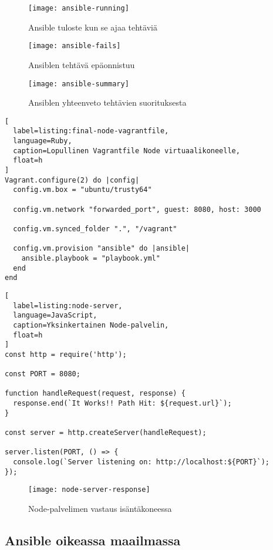 \begin{figure}[h]
  \texttt{[image: ansible-running]}
  \caption{Ansible tuloste kun se ajaa tehtäviä}
  \label{fig:ansible-running}
\end{figure}

\begin{figure}[h]
  \texttt{[image: ansible-fails]}
  \caption{Ansiblen tehtävä epäonnistuu}
  \label{fig:ansible-fails}
\end{figure}

\begin{figure}[h]
  \texttt{[image: ansible-summary]}
  \caption{Ansiblen yhteenveto tehtävien suorituksesta}
  \label{fig:ansible-summary}
\end{figure}

\begin{lstlisting}[
  label=listing:final-node-vagrantfile,
  language=Ruby,
  caption=Lopullinen Vagrantfile Node virtuaalikoneelle,
  float=h
]
Vagrant.configure(2) do |config|
  config.vm.box = "ubuntu/trusty64"

  config.vm.network "forwarded_port", guest: 8080, host: 3000

  config.vm.synced_folder ".", "/vagrant"

  config.vm.provision "ansible" do |ansible|
    ansible.playbook = "playbook.yml"
  end
end
\end{lstlisting}

\begin{lstlisting}[
  label=listing:node-server,
  language=JavaScript,
  caption=Yksinkertainen Node-palvelin,
  float=h
]
const http = require('http');

const PORT = 8080;

function handleRequest(request, response) {
  response.end(`It Works!! Path Hit: ${request.url}`);
}

const server = http.createServer(handleRequest);

server.listen(PORT, () => {
  console.log(`Server listening on: http://localhost:${PORT}`);
});
\end{lstlisting}

\begin{figure}[h]
  \texttt{[image: node-server-response]}
  \caption{Node-palvelimen vastaus isäntäkoneessa}
  \label{fig:node-server-response}
\end{figure}

\subsection{Ansible oikeassa maailmassa}

